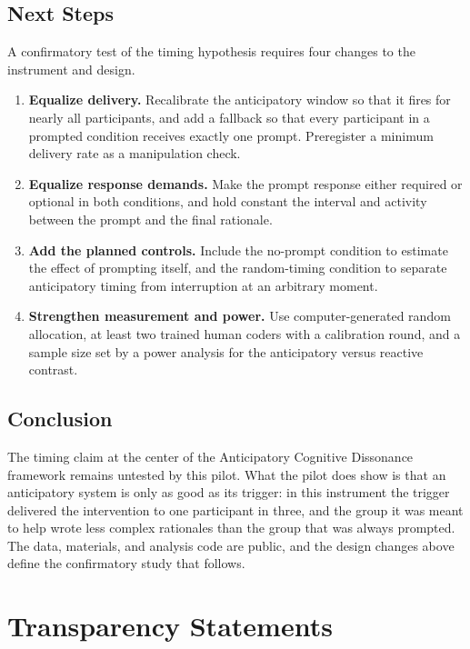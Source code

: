 \documentclass[12pt,letterpaper]{article}
\begin{document}
\subsection{Next Steps}
A confirmatory test of the timing hypothesis requires four changes to the instrument and design.
\begin{enumerate}
\item \textbf{Equalize delivery.} Recalibrate the anticipatory window so that it fires for nearly all participants, and add a fallback so that every participant in a prompted condition receives exactly one prompt. Preregister a minimum delivery rate as a manipulation check.
\item \textbf{Equalize response demands.} Make the prompt response either required or optional in both conditions, and hold constant the interval and activity between the prompt and the final rationale.
\item \textbf{Add the planned controls.} Include the no-prompt condition to estimate the effect of prompting itself, and the random-timing condition to separate anticipatory timing from interruption at an arbitrary moment.
\item \textbf{Strengthen measurement and power.} Use computer-generated random allocation, at least two trained human coders with a calibration round, and a sample size set by a power analysis for the anticipatory versus reactive contrast.
\end{enumerate}

\subsection{Conclusion}
The timing claim at the center of the Anticipatory Cognitive Dissonance framework remains untested by this pilot. What the pilot does show is that an anticipatory system is only as good as its trigger: in this instrument the trigger delivered the intervention to one participant in three, and the group it was meant to help wrote less complex rationales than the group that was always prompted. The data, materials, and analysis code are public, and the design changes above define the confirmatory study that follows.

\section{Transparency Statements}
\end{document}

